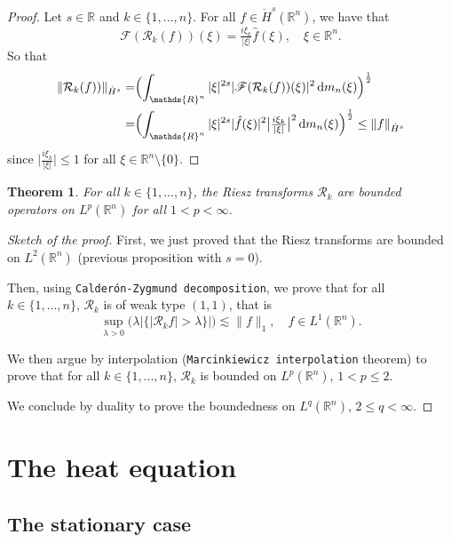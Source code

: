 \documentclass[a4paper, 12pt]{article}
\theoremstyle{plain}
\newtheorem{theorem}[proposition]{Theorem}
\theoremstyle{definition}
\theoremstyle{remark}
\numberwithin{equation}{section}
\begin{document}
\begin{proof}
Let $s\in{\mathds{R}}$ and $k\in\{1,...,n\}$. For all $f\in \dot H^s({\mathds{R}}^n)$, we have that 
\[
{\mathscr{F}}({\mathcal{R}}_k(f))(\xi)=\tfrac{i\xi_k}{|\xi|}\hat{f}(\xi), \quad  \xi\in{\mathds{R}}^n.
\]  
So that
%
\begin{align*}
\|{\mathcal{R}}_k(f))\|_{\dot H^s}=&\Bigl(\int_{{\mathds{R}}^n}|\xi|^{2s}|{\mathscr{F}}({\mathcal{R}}_k(f))(\xi)|^2\,{\rm d}m_n(\xi)\Bigr)^{\frac{1}{2}}\\
=&\Bigl(\int_{{\mathds{R}}^n}|\xi|^{2s}|\hat{f}(\xi)|^2\bigl|\tfrac{i\xi_k}{|\xi|}\bigr|^2\,{\rm d}m_n(\xi)\Bigr)^{\frac{1}{2}}
\le\|f\|_{\dot H^s}
\end{align*}
%
since $\bigl|\tfrac{i\xi_k}{|\xi|}\bigr|\le 1$ for all $\xi\in{\mathds{R}}^n\setminus\{0\}$.
\end{proof}

\begin{theorem}
For all $k\in \{1,...,n\}$, the Riesz transforms ${\mathcal{R}}_k$ are bounded operators on $L^p({\mathds{R}}^n)$ for all $1<p<\infty$.
\end{theorem}

\begin{proof}[Sketch of the proof]
First, we just proved that the Riesz transforms are bounded on $L^2({\mathds{R}}^n)$ (previous proposition with $s=0$).

\noindent
Then, using {\tt Calder\'on-Zygmund decomposition}, we prove that for all $k\in\{1,...,n\}$, ${\mathcal{R}}_k$ is of weak type $(1,1)$, that is
\[
\sup_{\lambda>0}\bigl(\lambda\bigl|\{|{\mathcal{R}}_k f|>\lambda\}\bigr|\bigr)\lesssim \|f\|_1, \quad f\in L^1({\mathds{R}}^n).
\]

\noindent
We then argue by interpolation ({\tt Marcinkiewicz interpolation} theorem) to prove that for all $k\in\{1,...,n\}$, ${\mathcal{R}}_k$
is bounded on $L^p({\mathds{R}}^n)$, $1<p\le 2$.

\noindent
We conclude by duality to prove the boundedness on $L^q({\mathds{R}}^n)$, $2\le q <\infty$.
\end{proof}



\section{The heat equation}

\subsection{The stationary case}
\end{document}
